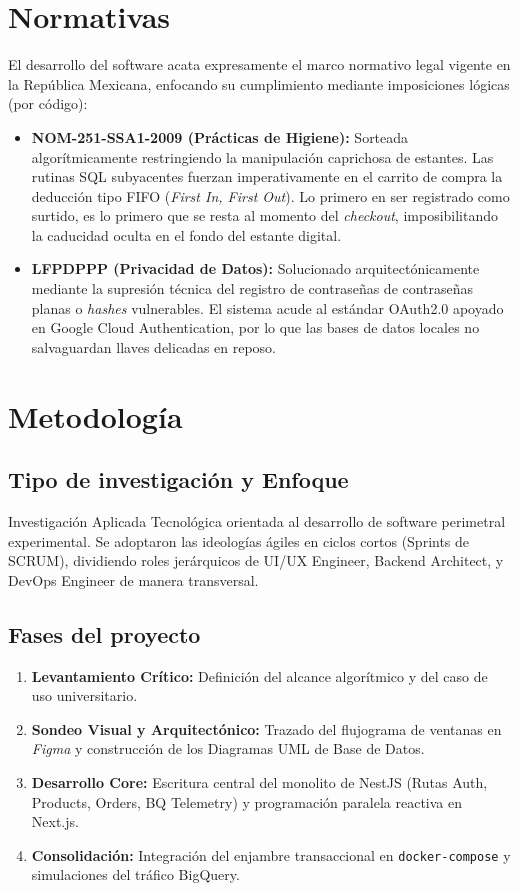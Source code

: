 \documentclass[12pt, a4paper]{article}
\begin{document}
\section{Normativas}
El desarrollo del software acata expresamente el marco normativo legal vigente en la República Mexicana, enfocando su cumplimiento mediante imposiciones lógicas (por código):

\begin{itemize}
    \item \textbf{NOM-251-SSA1-2009 (Prácticas de Higiene):} Sorteada algorítmicamente restringiendo la manipulación caprichosa de estantes. Las rutinas SQL subyacentes fuerzan imperativamente en el carrito de compra la deducción tipo FIFO (\textit{First In, First Out}). Lo primero en ser registrado como surtido, es lo primero que se resta al momento del \textit{checkout}, imposibilitando la caducidad oculta en el fondo del estante digital.
    \item \textbf{LFPDPPP (Privacidad de Datos):} Solucionado arquitectónicamente mediante la supresión técnica del registro de contraseñas de contraseñas planas o \textit{hashes} vulnerables. El sistema acude al estándar OAuth2.0 apoyado en Google Cloud Authentication, por lo que las bases de datos locales no salvaguardan llaves delicadas en reposo.
\end{itemize}

\section{Metodología}

\subsection{Tipo de investigación y Enfoque}
Investigación Aplicada Tecnológica orientada al desarrollo de software perimetral experimental. Se adoptaron las ideologías ágiles en ciclos cortos (Sprints de SCRUM), dividiendo roles jerárquicos de UI/UX Engineer, Backend Architect, y DevOps Engineer de manera transversal.

\subsection{Fases del proyecto}
\begin{enumerate}
    \item \textbf{Levantamiento Crítico:} Definición del alcance algorítmico y del caso de uso universitario.
    \item \textbf{Sondeo Visual y Arquitectónico:} Trazado del flujograma de ventanas en \textit{Figma} y construcción de los Diagramas UML de Base de Datos.
    \item \textbf{Desarrollo Core:} Escritura central del monolito de NestJS (Rutas Auth, Products, Orders, BQ Telemetry) y programación paralela reactiva en Next.js.
    \item \textbf{Consolidación:} Integración del enjambre transaccional en \texttt{docker-compose} y simulaciones del tráfico BigQuery.
\end{enumerate}
\end{document}
